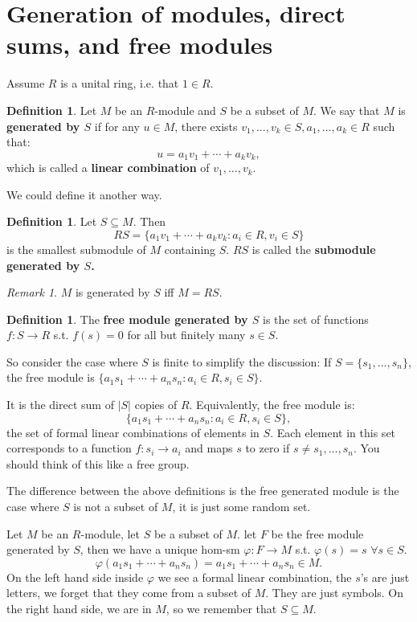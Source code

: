 \documentclass[9pt,reqno,twoside]{amsbook}
\theoremstyle{plain}
\numberwithin{section}{chapter}
\numberwithin{equation}{chapter}
\theoremstyle{definition}
\newtheorem{Def}[theorem]{Definition}
\theoremstyle{remark}
\newtheorem{rem}[theorem]{Remark}
\theoremstyle{plain}
\newcommand{\sub}{\subseteq}
\renewcommand{\phi}{\varphi}
\begin{document}
\section{Generation of modules, direct sums, and free modules}


Assume $R$ is a unital ring, i.e. that $1 \in R$. 
\begin{Def}
Let $M$ be an $R$-module and $S$ be a subset of $M$. We say that $M$ is \textbf{generated by $S$} if for any $u \in M$, there exists $v_1,...,v_k \in S, a_1,...,a_k \in R$ such that:
$$
u = a_1v_1 + \cdots + a_kv_k,
$$
which is called a \textbf{linear combination} of $v_1,...,v_k$. 
\end{Def}

We could define it another way. 
\begin{Def}
Let $S \sub M$. Then 
$$
RS = \{a_1v_1 + \cdots + a_kv_k: a_i\in R, v_i \in S\}
$$
is the smallest submodule of $M$ containing $S$. $RS$ is called the \textbf{submodule generated by $S$. }
\end{Def}

\begin{rem}
$M$ is generated by $S$ iff $M = RS$. 
\end{rem}

\begin{Def}
The \textbf{free module generated by $S$} is the set of functions $f:S \to R$ s.t. $f(s) = 0$ for all but finitely many $s \in S$. 
\end{Def}
So consider the case where $S$ is finite to simplify the discussion: If $S = \{s_1,...,s_n\}$, the free module is $\{a_1s_1+ \cdots + a_ns_n: a_i \in R,s_i \in S\}$. 


It is the direct sum of $|S|$ copies of $R$. Equivalently, the free module is:
$$
\{a_1s_1 + \cdots + a_ns_n:a_i \in R, s_i \in S\},
$$
the set of formal linear combinations of elements in $S$. Each element in this set corresponds to a function $f:s_i \to a_i$ and maps $s$ to zero if $s \neq s_1,...,s_n$. You should think of this like a free group. 

The difference between the above definitions is the free generated module is the case where $S$ is not a subset of $M$, it is just some random set. 

Let $M$ be an $R$-module, let $S$ be a subset of $M$. let $F$ be the free module generated by $S$, then we have a unique hom-sm $\phi:F \to M$ s.t. $\phi(s) = s$ $\forall s \in S$. 
$$
\phi(a_1s_1 + \cdots + a_ns_n) = a_1s_1 + \cdots + a_ns_n \in M.
$$
On the left hand side inside $\phi$ we see a formal linear combination, the $s$'s are just letters, we forget that they come from a subset of $M$. They are just symbols. On the right hand side, we are in $M$, so we remember that $S \sub M$. 
\end{document}
